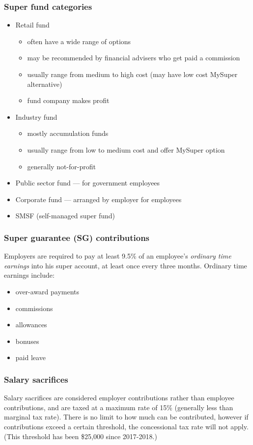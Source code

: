 \documentclass[oneside]{book}
\begin{document}
\subsubsection{Super fund categories}
\begin{itemize}
	\item Retail fund
	\begin{itemize}
		\item often have a wide range of options
		\item may be recommended by financial advisers who get paid a commission
		\item usually range from medium to high cost (may have low cost MySuper alternative)
		\item fund company makes profit
	\end{itemize}
	\item Industry fund
	\begin{itemize}
		\item mostly accumulation funds
		\item usually range from low to medium cost and offer MySuper option
		\item generally not-for-profit
	\end{itemize}
	\item Public sector fund --- for government employees
 	\item Corporate fund --- arranged by employer for employees
	\item SMSF (self-managed super fund)
\end{itemize}

\subsubsection{Super guarantee (SG) contributions}
Employers are required to pay at least 9.5\% of an employee's \textit{ordinary time earnings} into his super account, at least once every three months. Ordinary time earnings include:
\begin{itemize}
	\item over-award payments
	\item commissions
	\item allowances
	\item bonuses
	\item paid leave
\end{itemize}

\subsubsection{Salary sacrifices}
Salary sacrifices are considered employer contributions rather than employee contributions, and are taxed at a maximum rate of 15\% (generally less than marginal tax rate). There is no limit to how much can be contributed, however if contributions exceed a certain threshold, the concessional tax rate will not apply. (This threshold has been \$25,000 since 2017-2018.)
\end{document}
